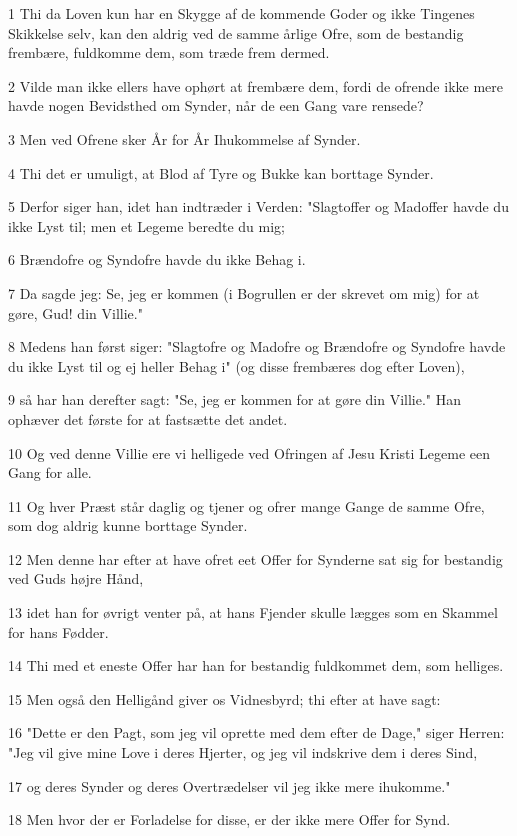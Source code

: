 \par 1 Thi da Loven kun har en Skygge af de kommende Goder og ikke Tingenes Skikkelse selv, kan den aldrig ved de samme årlige Ofre, som de bestandig frembære, fuldkomme dem, som træde frem dermed.
\par 2 Vilde man ikke ellers have ophørt at frembære dem, fordi de ofrende ikke mere havde nogen Bevidsthed om Synder, når de een Gang vare rensede?
\par 3 Men ved Ofrene sker År for År Ihukommelse af Synder.
\par 4 Thi det er umuligt, at Blod af Tyre og Bukke kan borttage Synder.
\par 5 Derfor siger han, idet han indtræder i Verden: "Slagtoffer og Madoffer havde du ikke Lyst til; men et Legeme beredte du mig;
\par 6 Brændofre og Syndofre havde du ikke Behag i.
\par 7 Da sagde jeg: Se, jeg er kommen (i Bogrullen er der skrevet om mig) for at gøre, Gud! din Villie."
\par 8 Medens han først siger: "Slagtofre og Madofre og Brændofre og Syndofre havde du ikke Lyst til og ej heller Behag i" (og disse frembæres dog efter Loven),
\par 9 så har han derefter sagt: "Se, jeg er kommen for at gøre din Villie." Han ophæver det første for at fastsætte det andet.
\par 10 Og ved denne Villie ere vi helligede ved Ofringen af Jesu Kristi Legeme een Gang for alle.
\par 11 Og hver Præst står daglig og tjener og ofrer mange Gange de samme Ofre, som dog aldrig kunne borttage Synder.
\par 12 Men denne har efter at have ofret eet Offer for Synderne sat sig for bestandig ved Guds højre Hånd,
\par 13 idet han for øvrigt venter på, at hans Fjender skulle lægges som en Skammel for hans Fødder.
\par 14 Thi med et eneste Offer har han for bestandig fuldkommet dem, som helliges.
\par 15 Men også den Helligånd giver os Vidnesbyrd; thi efter at have sagt:
\par 16 "Dette er den Pagt, som jeg vil oprette med dem efter de Dage," siger Herren: "Jeg vil give mine Love i deres Hjerter, og jeg vil indskrive dem i deres Sind,
\par 17 og deres Synder og deres Overtrædelser vil jeg ikke mere ihukomme."
\par 18 Men hvor der er Forladelse for disse, er der ikke mere Offer for Synd.

